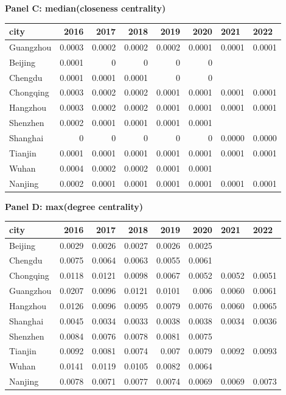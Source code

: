 \textbf{Panel C: median(closeness centrality)}\\
\begin{tabular}{lrrrrrll}
\hline
 city      &   2016 &   2017 &   2018 &   2019 &   2020 & 2021   & 2022   \\
\hline
 Guangzhou & 0.0003 & 0.0002 & 0.0002 & 0.0002 & 0.0001 & 0.0001 & 0.0001 \\
 Beijing   & 0.0001 & 0      & 0      & 0      & 0      &        &        \\
 Chengdu   & 0.0001 & 0.0001 & 0.0001 & 0      & 0      &        &        \\
 Chongqing & 0.0003 & 0.0002 & 0.0002 & 0.0001 & 0.0001 & 0.0001 & 0.0001 \\
 Hangzhou  & 0.0003 & 0.0002 & 0.0002 & 0.0001 & 0.0001 & 0.0001 & 0.0001 \\
 Shenzhen  & 0.0002 & 0.0001 & 0.0001 & 0.0001 & 0.0001 &        &        \\
 Shanghai  & 0      & 0      & 0      & 0      & 0      & 0.0000 & 0.0000 \\
 Tianjin   & 0.0001 & 0.0001 & 0.0001 & 0.0001 & 0.0001 & 0.0001 & 0.0001 \\
 Wuhan     & 0.0004 & 0.0002 & 0.0002 & 0.0001 & 0.0001 &        &        \\
 Nanjing   & 0.0002 & 0.0001 & 0.0001 & 0.0001 & 0.0001 & 0.0001 & 0.0001 \\
\hline
\end{tabular}

\textbf{Panel D: max(degree centrality)}\\
\begin{tabular}{lrrrrrll}
\hline
 city      &   2016 &   2017 &   2018 &   2019 &   2020 & 2021   & 2022   \\
\hline
 Beijing   & 0.0029 & 0.0026 & 0.0027 & 0.0026 & 0.0025 &        &        \\
 Chengdu   & 0.0075 & 0.0064 & 0.0063 & 0.0055 & 0.0061 &        &        \\
 Chongqing & 0.0118 & 0.0121 & 0.0098 & 0.0067 & 0.0052 & 0.0052 & 0.0051 \\
 Guangzhou & 0.0207 & 0.0096 & 0.0121 & 0.0101 & 0.006  & 0.0060 & 0.0061 \\
 Hangzhou  & 0.0126 & 0.0096 & 0.0095 & 0.0079 & 0.0076 & 0.0060 & 0.0065 \\
 Shanghai  & 0.0045 & 0.0034 & 0.0033 & 0.0038 & 0.0038 & 0.0034 & 0.0036 \\
 Shenzhen  & 0.0084 & 0.0076 & 0.0078 & 0.0081 & 0.0075 &        &        \\
 Tianjin   & 0.0092 & 0.0081 & 0.0074 & 0.007  & 0.0079 & 0.0092 & 0.0093 \\
 Wuhan     & 0.0141 & 0.0119 & 0.0105 & 0.0082 & 0.0064 &        &        \\
 Nanjing   & 0.0078 & 0.0071 & 0.0077 & 0.0074 & 0.0069 & 0.0069 & 0.0073 \\
\hline
\end{tabular}

